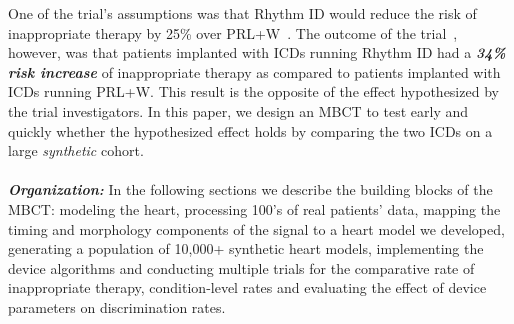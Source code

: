 One of the trial's assumptions was that Rhythm ID would reduce the risk of inappropriate therapy by 25\% over PRL+W~\cite{Berger06_RIGHT}.
The outcome of the trial~\cite{GoldABBTB11_RIGHTresults}, however, was that patients implanted with ICDs running Rhythm ID had a \emph{\textbf{34\% risk increase}} of inappropriate therapy as compared to patients implanted with \acp{ICD} running PRL+W. 
This result  is the opposite of the effect hypothesized by the trial investigators. 
In this paper, we design an \ac{MBCT} to test early and quickly whether the hypothesized effect holds by comparing the two ICDs on a large \emph{synthetic} cohort.\\\\
\textbf{\emph{Organization:}} In the following sections we describe the building blocks of the MBCT: modeling the heart, processing 100's of real patients' data, mapping the timing and morphology components of the signal to a heart model we developed, generating a population of 10,000+ synthetic heart models, implementing the device algorithms and conducting multiple trials for the comparative rate of inappropriate therapy, condition-level rates and evaluating the effect of device parameters on discrimination rates.




